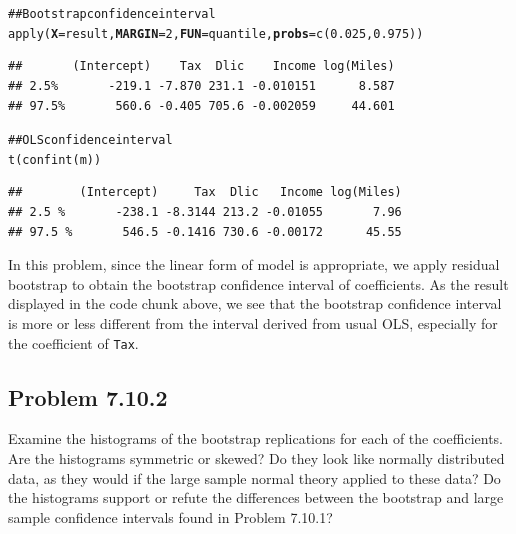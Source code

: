 \documentclass[12pt,oneside,a4paper]{article}\usepackage[]{graphicx}\usepackage[]{xcolor}
\makeatletter
\newcommand{\hlnum}[1]{\textcolor[rgb]{0,0,0}{#1}}%
\newcommand{\hlcom}[1]{\textcolor[rgb]{0.443,0.478,0.702}{#1}}%
\newcommand{\hlstd}[1]{\textcolor[rgb]{0,0,0}{#1}}%
\newcommand{\hlkwc}[1]{\textcolor[rgb]{0.498,0,0.333}{\textbf{#1}}}%
\newcommand{\hlkwd}[1]{\textcolor[rgb]{0,0,0}{#1}}%
\newenvironment{kframe}{%
 \def\at@end@of@kframe{}%
 \ifinner\ifhmode%
  \def\at@end@of@kframe{\end{minipage}}%
  \begin{minipage}{\columnwidth}%
 \fi\fi%
 \def\FrameCommand##1{\hskip\@totalleftmargin \hskip-\fboxsep
 \colorbox{shadecolor}{##1}\hskip-\fboxsep
     \hskip-\linewidth \hskip-\@totalleftmargin \hskip\columnwidth}%
 \MakeFramed {\advance\hsize-\width
   \@totalleftmargin\z@ \linewidth\hsize
   \@setminipage}}%
 {\par\unskip\endMakeFramed%
 \at@end@of@kframe}
\newenvironment{knitrout}{}{} %
\newcommand{\subproblem}[1]
{
    \subsection*{Problem {#1}}
}
\newcommand{\m}[1]{\texttt{{#1}}}
\makeatother
\begin{document}
\begin{knitrout}
\begin{kframe}
\begin{alltt}
\hlcom{## Bootstrap confidence interval}
\hlkwd{apply}\hlstd{(}\hlkwc{X} \hlstd{= result,} \hlkwc{MARGIN} \hlstd{=} \hlnum{2}\hlstd{,} \hlkwc{FUN} \hlstd{= quantile,} \hlkwc{probs} \hlstd{=} \hlkwd{c}\hlstd{(}\hlnum{0.025}\hlstd{,} \hlnum{0.975}\hlstd{))}
\end{alltt}
\begin{verbatim}
##       (Intercept)    Tax  Dlic    Income log(Miles)
## 2.5%       -219.1 -7.870 231.1 -0.010151      8.587
## 97.5%       560.6 -0.405 705.6 -0.002059     44.601
\end{verbatim}
\begin{alltt}
\hlcom{## OLS confidence interval}
\hlkwd{t}\hlstd{(}\hlkwd{confint}\hlstd{(m))}
\end{alltt}
\begin{verbatim}
##        (Intercept)     Tax  Dlic   Income log(Miles)
## 2.5 %       -238.1 -8.3144 213.2 -0.01055       7.96
## 97.5 %       546.5 -0.1416 730.6 -0.00172      45.55
\end{verbatim}
\end{kframe}
\end{knitrout}

In this problem, since the linear form of model is appropriate, we apply residual bootstrap to obtain the bootstrap confidence interval of coefficients. As the result displayed in the code chunk above, we see that the bootstrap confidence interval is more or less different from the interval derived from usual OLS, especially for the coefficient of \m{Tax}.

\subproblem{7.10.2}
Examine the histograms of the bootstrap replications for each of the coefficients. Are the histograms symmetric or skewed? Do they look like normally distributed data, as they would if the large sample normal theory applied to these data? Do the histograms support or refute the differences between the bootstrap and large sample confidence intervals found in Problem 7.10.1?
\end{document}
